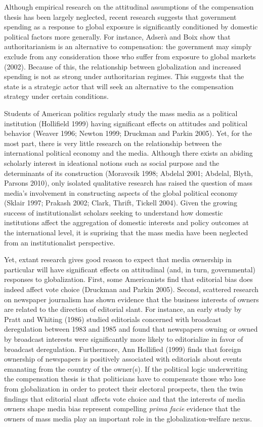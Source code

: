 \documentclass[12pt]{report}
\begin{document}
Although empirical research on the attitudinal assumptions of the compensation thesis has been
largely neglected, recent research suggests that government spending as a response to global
exposure is significantly conditioned by domestic political factors more generally. For
instance, Adser\`{a} and Boix show that authoritarianism is an alternative to compensation: the
government may simply exclude from any consideration those who suffer from exposure to global
markets (2002). Because of this, the relationship between globalization and increased spending
is not as strong under authoritarian regimes. This suggests that the state is a strategic actor
that will seek an alternative to the compensation strategy under certain conditions.

Students of American politics regularly study the mass media as a political institution
(Hollifield 1999) having significant effects on attitudes and political behavior (Weaver 1996;
Newton 1999; Druckman and Parkin 2005). Yet, for the most part, there is very little research on
the relationship between the international political economy and the media. Although there
exists an abiding scholarly interest in ideational notions such as social purpose and the
determinants of its construction (Moravcsik 1998; Abdelal 2001; Abdelal, Blyth, Parsons 2010),
only isolated qualitative research has raised the question of mass media's involvement in
constructing aspects of the global political economy (Sklair 1997; Prakash 2002; Clark, Thrift,
Tickell 2004). Given the growing success of institutionalist scholars seeking to understand how
domestic institutions affect the aggregation of domestic interests and policy outcomes at the
international level, it is suprising that the mass media have been neglected from an
institutionalist perspective.

Yet, extant research gives good reason to expect that media ownership in particular will have
significant effects on attitudinal (and, in turn, governmental) responses to globalization.
First, some Americanists find that editorial bias does indeed affect vote choice (Druckman and
Parkin 2005). Second, scattered research on newspaper journalism has shown evidence that the
business interests of owners are related to the direction of editorial slant. For instance, an
early study by Pratt and Whiting (1986) studied editorials concerned with broadcast deregulation
between 1983 and 1985 and found that newspapers owning or owned by broadcast interests were
significantly more likely to editorialize in favor of broadcast deregulation. Furthermore, Ann
Hollified (1999) finds that foreign ownership of newspapers is positively associated with
editorials about events emanating from the country of the owner(s). If the political logic
underwriting the compensation thesis is that politicians have to compensate those who lose from
globalization in order to protect their electoral prospects, then the twin findings that
editorial slant affects vote choice and that the interests of media owners shape media bias
represent compelling \emph{prima facie} evidence that the owners of mass media play an important
role in the globalization-welfare nexus.
\end{document}
